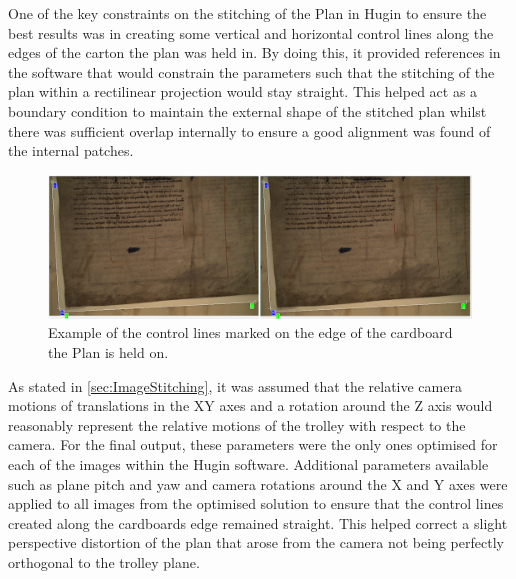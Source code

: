 	One of the key constraints on the stitching of the Plan in Hugin to ensure the best results was in creating some vertical and horizontal control lines along the edges of the carton the plan was held in. By doing this, it provided references in the software that would constrain the parameters such that the stitching of the plan within a rectilinear projection would stay straight. This helped act as a boundary condition to maintain the external shape of the stitched plan whilst there was sufficient overlap internally to ensure a good alignment was found of the internal patches.
	
	\begin{figure}[H]
		\centering
		\includegraphics[width=1\textwidth]{img/ControlLines.PNG}
		\caption{Example of the control lines marked on the edge of the cardboard the Plan is held on.}
		\label{fig:ControlLines}
	\end{figure}
	
	As stated in \cref{sec:ImageStitching}, it was assumed that the relative camera motions of translations in the XY axes and a rotation around the Z axis would reasonably represent the relative motions of the trolley with respect to the camera. For the final output, these parameters were the only ones optimised for each of the images within the Hugin software. Additional parameters available such as plane pitch and yaw and camera rotations around the X and Y axes were applied to all images from the optimised solution to ensure that the control lines created along the cardboards edge remained straight. This helped correct a slight perspective distortion of the plan that arose from the camera not being perfectly orthogonal to the trolley plane.
	
